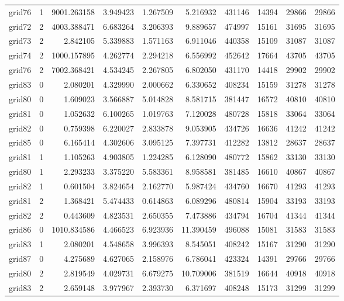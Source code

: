 \begin{longtable}{|l|r|r|r|r|r|r|r|r|r|}
grid76 & 1 & 9001.263158 & 3.949423 & 1.267509 & 5.216932 & 431146 & 14394 & 29866 & 29866 \\
grid72 & 2 & 4003.388471 & 6.683264 & 3.206393 & 9.889657 & 474997 & 15161 & 31695 & 31695 \\
grid73 & 2 & 2.842105 & 5.339883 & 1.571163 & 6.911046 & 440358 & 15109 & 31087 & 31087 \\
grid74 & 2 & 1000.157895 & 4.262774 & 2.294218 & 6.556992 & 452642 & 17664 & 43705 & 43705 \\
grid76 & 2 & 7002.368421 & 4.534245 & 2.267805 & 6.802050 & 431170 & 14418 & 29902 & 29902 \\
grid83 & 0 & 2.080201 & 4.329990 & 2.000662 & 6.330652 & 408234 & 15159 & 31278 & 31278 \\
grid80 & 0 & 1.609023 & 3.566887 & 5.014828 & 8.581715 & 381447 & 16572 & 40810 & 40810 \\
grid81 & 0 & 1.052632 & 6.100265 & 1.019763 & 7.120028 & 480728 & 15818 & 33064 & 33064 \\
grid82 & 0 & 0.759398 & 6.220027 & 2.833878 & 9.053905 & 434726 & 16636 & 41242 & 41242 \\
grid85 & 0 & 6.165414 & 4.302606 & 3.095125 & 7.397731 & 412282 & 13812 & 28637 & 28637 \\
grid81 & 1 & 1.105263 & 4.903805 & 1.224285 & 6.128090 & 480772 & 15862 & 33130 & 33130 \\
grid80 & 1 & 2.293233 & 3.375220 & 5.583361 & 8.958581 & 381485 & 16610 & 40867 & 40867 \\
grid82 & 1 & 0.601504 & 3.824654 & 2.162770 & 5.987424 & 434760 & 16670 & 41293 & 41293 \\
grid81 & 2 & 1.368421 & 5.474433 & 0.614863 & 6.089296 & 480814 & 15904 & 33193 & 33193 \\
grid82 & 2 & 0.443609 & 4.823531 & 2.650355 & 7.473886 & 434794 & 16704 & 41344 & 41344 \\
grid86 & 0 & 1010.834586 & 4.466523 & 6.923936 & 11.390459 & 496088 & 15081 & 31583 & 31583 \\
grid83 & 1 & 2.080201 & 4.548658 & 3.996393 & 8.545051 & 408242 & 15167 & 31290 & 31290 \\
grid87 & 0 & 4.275689 & 4.627065 & 2.158976 & 6.786041 & 423324 & 14391 & 29766 & 29766 \\
grid80 & 2 & 2.819549 & 4.029731 & 6.679275 & 10.709006 & 381519 & 16644 & 40918 & 40918 \\
grid83 & 2 & 2.659148 & 3.977967 & 2.393730 & 6.371697 & 408248 & 15173 & 31299 & 31299 \\

\end{longtable}
